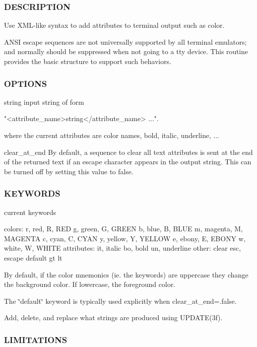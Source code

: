 \subsubsection*{D\+E\+S\+C\+R\+I\+P\+T\+I\+ON}

Use X\+M\+L-\/like syntax to add attributes to terminal output such as color.

A\+N\+SI escape sequences are not universally supported by all terminal emulators; and normally should be suppressed when not going to a tty device. This routine provides the basic structure to support such behaviors.

\subsubsection*{O\+P\+T\+I\+O\+NS}

string input string of form \begin{DoxyVerb}            "<attribute_name>string</attribute_name> ...".

           where the current attributes are color names,
           bold, italic, underline, ...
\end{DoxyVerb}


clear\+\_\+at\+\_\+end By default, a sequence to clear all text attributes is sent at the end of the returned text if an escape character appears in the output string. This can be turned off by setting this value to false. \subsubsection*{K\+E\+Y\+W\+O\+R\+DS}

current keywords

colors\+: r, red, R, R\+ED g, green, G, G\+R\+E\+EN b, blue, B, B\+L\+UE m, magenta, M, M\+A\+G\+E\+N\+TA c, cyan, C, C\+Y\+AN y, yellow, Y, Y\+E\+L\+L\+OW e, ebony, E, E\+B\+O\+NY w, white, W, W\+H\+I\+TE attributes\+: it, italic bo, bold un, underline other\+: clear esc, escape default gt lt

By default, if the color mnemonics (ie. the keywords) are uppercase they change the background color. If lowercase, the foreground color.

The \char`\"{}default\char`\"{} keyword is typically used explicitly when clear\+\_\+at\+\_\+end=.false.

Add, delete, and replace what strings are produced using U\+P\+D\+A\+T\+E(3f).

\subsubsection*{L\+I\+M\+I\+T\+A\+T\+I\+O\+NS}

